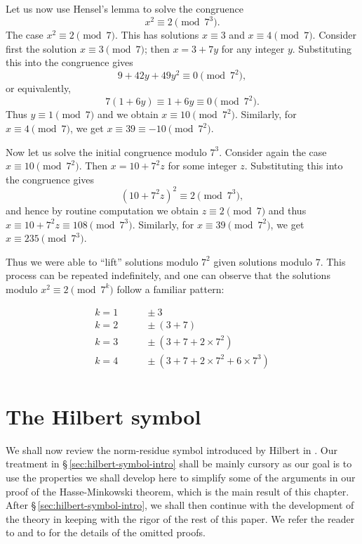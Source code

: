 \smallskip

Let us now use Hensel's lemma to solve the congruence
\[
    x^2 \equiv 2 \pmod{7^3}.  
\]
The case \(x^2 \equiv 2 \pmod{7}\). This has solutions \(x \equiv 3\) and \(x \equiv 4 \pmod{7}\). Consider first the solution \(x \equiv 3 \pmod{7}\); then \(x = 3 + 7y\) for any integer \(y\). Substituting this into the congruence gives
\[
    9 + 42y + 49y^2 \equiv 0 \pmod{7^2},
\]
or equivalently,
\[
    7(1 + 6y) \equiv 1 + 6y \equiv 0 \pmod{7^2}.
\]
Thus \(y \equiv 1 \pmod{7}\) and we obtain \(x \equiv 10 \pmod{7^2}\). Similarly, for \(x \equiv 4 \pmod{7}\), we get \(x \equiv 39 \equiv -10 \pmod{7^2}\).

Now let us solve the initial congruence modulo \(7^3\). Consider again the case \(x \equiv 10 \pmod{7^2}\). Then \(x = 10 + 7^2z\) for some integer \(z\). Substituting this into the congruence gives
\[
    (10+7^2z)^2 \equiv 2 \pmod{7^3},
\]
and hence by routine computation we obtain \(z \equiv 2 \pmod{7}\) and thus \(x \equiv 10 + 7^2z \equiv 108 \pmod{7^3}\). Similarly, for \(x \equiv 39 \pmod{7^2}\), we get \(x \equiv 235 \pmod{7^3}\).

Thus we were able to ``lift'' solutions modulo \(7^2\) given solutions modulo \(7\). This process can be repeated indefinitely, and one can observe that the solutions modulo \(x^2 \equiv 2 \pmod{7^k}\) follow a familiar pattern:

\begin{align*}
    k = 1 & \qquad \pm 3 \\
    k = 2 & \qquad \pm (3 + 7) \\
    k = 3 & \qquad \pm (3 + 7 + 2 \times 7^2) \\
    k = 4 & \qquad \pm (3 + 7 + 2 \times 7^2 + 6 \times 7^3) \\
\end{align*}

\section{The Hilbert symbol}\label{sec:hilbert-symbol}

We shall now review the norm-residue symbol introduced by Hilbert in \cite[pp.~286--287]{hilbert1932theorie}. Our treatment in \S\,\ref{sec:hilbert-symbol-intro} shall be mainly cursory as our goal is to use the properties we shall develop here to simplify some of the arguments in our proof of the Hasse-Minkowski theorem, which is the main result of this chapter. After \S\,\ref{sec:hilbert-symbol-intro}, we shall then continue with the development of the theory in keeping with the rigor of the rest of this paper.  We refer the reader to \cite{serre2012course} and to \cite{sutherland2013introduction} for the details of the omitted proofs.

